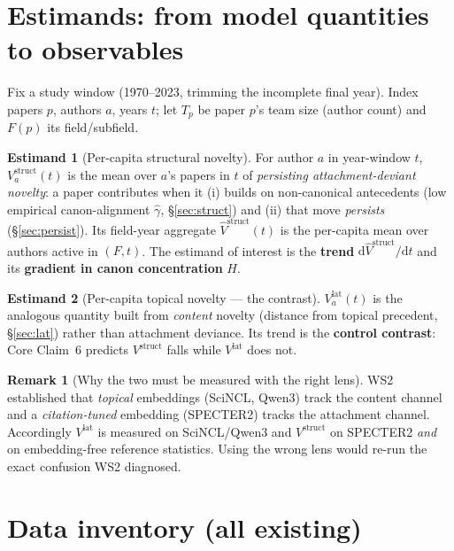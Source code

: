 \documentclass[11pt,letterpaper]{article}
\theoremstyle{definition}
\newtheorem{estimand}{Estimand}
\newtheorem{remark}{Remark}[section]
\theoremstyle{plain}
\newcommand{\Vstruct}{V^{\mathrm{struct}}}
\newcommand{\Vlat}{V^{\mathrm{lat}}}
\begin{document}
\section{Estimands: from model quantities to observables}\label{sec:estimands}

Fix a study window (1970--2023, trimming the incomplete final year). Index papers
$p$, authors $a$, years $t$; let $T_p$ be paper $p$'s team size (author count) and
$F(p)$ its field/subfield.

\begin{estimand}[Per-capita structural novelty]\label{est:struct}
For author $a$ in year-window $t$, $\Vstruct_a(t)$ is the mean over $a$'s papers
in $t$ of \emph{persisting attachment-deviant novelty}: a paper contributes when
it (i) builds on non-canonical antecedents (low empirical canon-alignment
$\hat\gamma$, \S\ref{sec:struct}) and (ii) that move \emph{persists}
(\S\ref{sec:persist}). Its field-year aggregate $\hat\Vstruct(t)$ is the
per-capita mean over authors active in $(F,t)$. The estimand of interest is the
\textbf{trend} $\mathrm{d}\hat\Vstruct/\mathrm{d}t$ and its \textbf{gradient in
canon concentration} $H$.
\end{estimand}

\begin{estimand}[Per-capita topical novelty --- the contrast]\label{est:lat}
$\Vlat_a(t)$ is the analogous quantity built from \emph{content} novelty
(distance from topical precedent, \S\ref{sec:lat}) rather than attachment
deviance. Its trend is the \textbf{control contrast}: Core Claim~6 predicts
$\Vstruct$ falls while $\Vlat$ does not.
\end{estimand}

\begin{remark}[Why the two must be measured with the right lens]
WS2 established that \emph{topical} embeddings (SciNCL, Qwen3) track the content
channel and a \emph{citation-tuned} embedding (SPECTER2) tracks the attachment
channel. Accordingly $\Vlat$ is measured on SciNCL/Qwen3 and $\Vstruct$ on
SPECTER2 \emph{and} on embedding-free reference statistics. Using the wrong lens
would re-run the exact confusion WS2 diagnosed.
\end{remark}

\section{Data inventory (all existing)}
\end{document}
